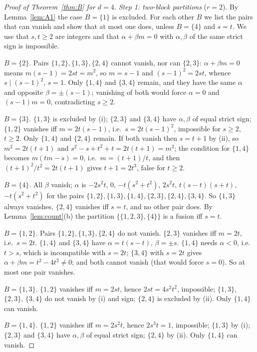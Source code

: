 \documentclass[11pt]{article}
\theoremstyle{remark}
\begin{document}
\begin{proof}[Proof of Theorem~\ref{thm:B} for $d=4$]
\emph{Step 1: two-block partitions} ($r=2$). By Lemma~\ref{lem:A1} the case $B=\{1\}$ is excluded. For each other $B$ we list the pairs that can vanish and show that at most one does, unless $B=\{4\}$ and $s=t$. We use that $s,t\ge2$ are integers and that $\alpha+\beta m=0$ with $\alpha,\beta$ of the same strict sign is impossible.

\smallskip\noindent$B=\{2\}$. Pairs $\{1,2\},\{1,3\},\{2,4\}$ cannot vanish, nor can $\{2,3\}$: $\alpha+\beta m=0$ means $m(s-1)=2st=m^2$, so $m=s-1$ and $(s-1)^2=2st$, whence $s\mid(s-1)^2$, $s=1$. Only $\{1,4\}$ and $\{3,4\}$ remain, and they have the same $\alpha$ and opposite $\beta=\pm(s-1)$; vanishing of both would force $\alpha=0$ and $(s-1)m=0$, contradicting $s\ge2$.

\smallskip\noindent$B=\{3\}$. $\{1,3\}$ is excluded by (i); $\{2,3\}$ and $\{3,4\}$ have $\alpha,\beta$ of equal strict sign; $\{1,2\}$ vanishes iff $m=2t(s-1)$, i.e.\ $s=2t(s-1)^2$, impossible for $s\ge2$, $t\ge2$. Only $\{1,4\}$ and $\{2,4\}$ remain. If both vanish then $s=t+1$ by (ii), so $m^2=2t(t+1)$ and $s^2-s+t^2+t=2t(t+1)=m^2$; the condition for $\{1,4\}$ becomes $m(tm-s)=0$, i.e.\ $m=(t+1)/t$, and then $(t+1)^2/t^2=2t(t+1)$ gives $t+1=2t^3$, false for $t\ge2$.

\smallskip\noindent$B=\{4\}$. All $\beta$ vanish; $\alpha$ is $-2s^2t$, $0$, $-t(s^2+t^2)$, $2s^2t$, $t(s-t)(s+t)$, $-t(s^2+t^2)$ for the pairs $\{1,2\},\{1,3\},\{1,4\},\{2,3\},\{2,4\},\{3,4\}$. So $\{1,3\}$ always vanishes, $\{2,4\}$ vanishes iff $s=t$, and no other pair does. By Lemma~\ref{lem:count}(b) the partition $\{\{1,2,3\},\{4\}\}$ is a fusion iff $s=t$.

\smallskip\noindent$B=\{1,2\}$. Pairs $\{1,2\},\{1,3\},\{2,4\}$ do not vanish. $\{2,3\}$ vanishes iff $m=2t$, i.e.\ $s=2t$. $\{1,4\}$ and $\{3,4\}$ have $\alpha=t(s-t)$, $\beta=\pm s$. $\{1,4\}$ needs $\alpha<0$, i.e.\ $t>s$, which is incompatible with $s=2t$; $\{3,4\}$ with $s=2t$ gives $\alpha+\beta m=t^2-4t^2\ne0$; and both cannot vanish (that would force $s=0$). So at most one pair vanishes.

\smallskip\noindent$B=\{1,3\}$. $\{1,2\}$ vanishes iff $m=2st$, hence $2st=4s^2t^2$, impossible; $\{1,3\}$, $\{2,3\}$, $\{3,4\}$ do not vanish by (i) and sign; $\{2,4\}$ is excluded by (ii). Only $\{1,4\}$ can vanish.

\smallskip\noindent$B=\{1,4\}$. $\{1,2\}$ vanishes iff $m=2s^2t$, hence $2s^3t=1$, impossible; $\{1,3\}$ by (i); $\{2,3\}$ and $\{3,4\}$ have $\alpha,\beta$ of equal strict sign; $\{2,4\}$ by (ii). Only $\{1,4\}$ can vanish.


\end{proof}
\end{document}
